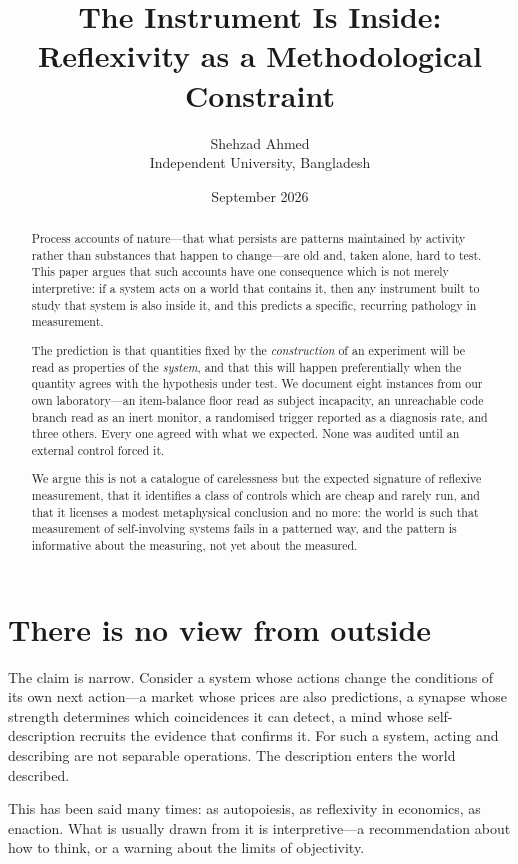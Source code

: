 \documentclass[11pt]{article}
\title{\bfseries The Instrument Is Inside:\\
Reflexivity as a Methodological Constraint}
\author{Shehzad Ahmed\\\small Independent University, Bangladesh}
\date{September 2026}
\begin{document}
\maketitle

\begin{abstract}
\noindent
Process accounts of nature---that what persists are patterns maintained by
activity rather than substances that happen to change---are old and, taken
alone, hard to test. This paper argues that such accounts have one consequence
which is not merely interpretive: if a system acts on a world that contains it,
then any instrument built to study that system is also inside it, and this
predicts a specific, recurring pathology in measurement.

The prediction is that quantities fixed by the \emph{construction} of an
experiment will be read as properties of the \emph{system}, and that this will
happen preferentially when the quantity agrees with the hypothesis under test.
We document eight instances from our own laboratory---an item-balance floor read
as subject incapacity, an unreachable code branch read as an inert monitor, a
randomised trigger reported as a diagnosis rate, and three others. Every one
agreed with what we expected. None was audited until an external control forced
it.

We argue this is not a catalogue of carelessness but the expected signature of
reflexive measurement, that it identifies a class of controls which are cheap
and rarely run, and that it licenses a modest metaphysical conclusion and no
more: the world is such that measurement of self-involving systems fails in a
patterned way, and the pattern is informative about the measuring, not yet
about the measured.
\end{abstract}

\section{There is no view from outside}

The claim is narrow. Consider a system whose actions change the conditions of
its own next action---a market whose prices are also predictions, a synapse
whose strength determines which coincidences it can detect, a mind whose
self-description recruits the evidence that confirms it. For such a system,
acting and describing are not separable operations. The description enters the
world described.

This has been said many times: as autopoiesis, as reflexivity in economics, as
enaction. What is usually drawn from it is interpretive---a recommendation
about how to think, or a warning about the limits of objectivity.
\end{document}
